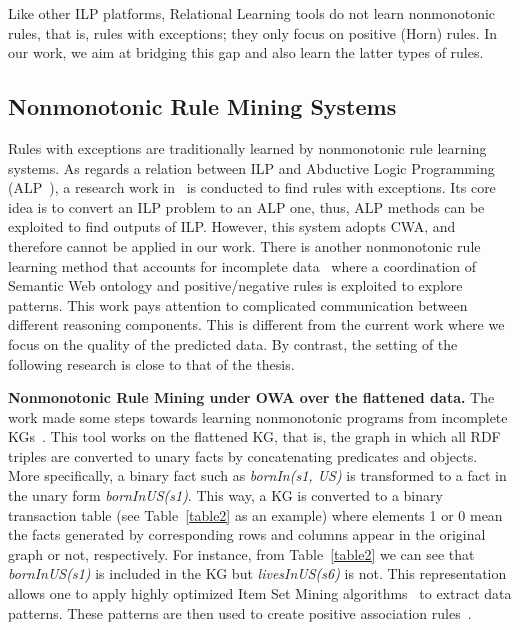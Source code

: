 Like other ILP platforms, Relational Learning tools do not learn nonmonotonic rules, that is, rules with exceptions; they only focus on positive (Horn) rules. In our work, we aim at bridging this gap and also learn the latter types of rules.

\subsection{Nonmonotonic Rule Mining Systems}
\label{related-work-nonmonotonic-rule-mining-systems}

Rules with exceptions are traditionally learned by nonmonotonic rule learning systems. As regards a relation between ILP and Abductive Logic Programming (ALP~\cite{ref31}), a research work in~\cite{ref32} is conducted to find rules with exceptions. Its core idea is to convert an ILP problem to an ALP one, thus, ALP methods can be exploited to find outputs of ILP. However, this system adopts CWA, and therefore cannot be applied in our work. There is another nonmonotonic rule learning method that accounts for incomplete data~\cite{ref34} where a coordination of Semantic Web ontology and positive/negative rules is exploited to explore patterns. This work pays attention to complicated communication between different reasoning components. This is different from the current work where we focus on the quality of the predicted data. By contrast, the setting of the following research is close to that of the thesis.

\textbf{Nonmonotonic Rule Mining under OWA over the flattened data.} The work made some steps towards learning nonmonotonic programs from incomplete KGs~\cite{ref12}. This tool works on the flattened KG, that is, the graph in which all RDF triples are converted to unary facts by concatenating predicates and objects. More specifically, a binary fact such as \textit{bornIn(s1, US)} is transformed to a fact in the unary form \textit{bornInUS(s1)}. This way, a KG is converted to a binary transaction table (see Table~\ref{table2} as an example) where elements 1 or 0 mean the facts generated by corresponding rows and columns appear in the original graph or not, respectively. For instance, from Table~\ref{table2} we can see that \textit{bornInUS(s1)} is included in the KG but \textit{livesInUS(s6)} is not. This representation allows one to apply highly optimized Item Set Mining algorithms~\cite{ref37} to extract data patterns. These patterns are then used to create positive association rules~\cite{ref13}.

